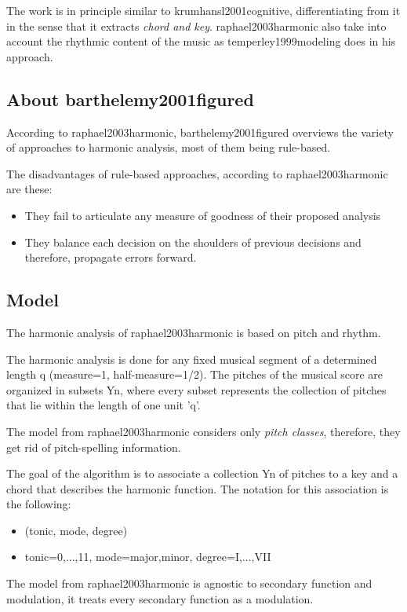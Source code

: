   The work is in principle similar to krumhansl2001cognitive, differentiating from it in the sense that it extracts \emph{chord and key}. raphael2003harmonic also take into account the rhythmic content of the music as temperley1999modeling does in his approach.



  \subsection{About barthelemy2001figured}
    According to raphael2003harmonic, barthelemy2001figured overviews the variety of approaches to harmonic analysis, most of them being rule-based.

    The disadvantages of rule-based approaches, according to raphael2003harmonic are these:
    \begin{itemize}
      \item They fail to articulate any measure of goodness of their proposed analysis
      \item They balance each decision on the shoulders of previous decisions and therefore, propagate errors forward.
    \end{itemize}

  \subsection{Model}
    The harmonic analysis of raphael2003harmonic is based on pitch and rhythm.

    The harmonic analysis is done for any fixed musical segment of a determined length q (measure=1, half-measure=1/2). The pitches of the musical score are organized in subsets Yn, where every subset represents the collection of pitches that lie within the length of one unit 'q'.

    The model from raphael2003harmonic considers only \emph{pitch classes}, therefore, they get rid of pitch-spelling information.

    The goal of the algorithm is to associate a collection Yn of pitches to a key and a chord that describes the harmonic function. The notation for this association is the following:
    \begin{itemize}
      \item (tonic, mode, degree)
      \item tonic={0,...,11}, mode={major,minor}, degree={I,...,VII}
    \end{itemize}

    The model from raphael2003harmonic is agnostic to secondary function and modulation, it treats every secondary function as a modulation.

